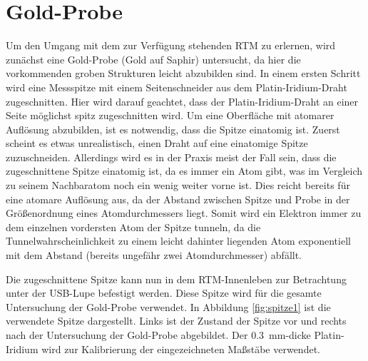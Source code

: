 \section{Gold-Probe}\label{sec:gold}
Um den Umgang mit dem zur Verfügung stehenden RTM zu erlernen, wird zunächst eine Gold-Probe (Gold auf Saphir) untersucht, da hier die vorkommenden groben Strukturen leicht
abzubilden sind. In einem ersten Schritt wird eine Messspitze mit einem Seitenschneider aus dem Platin-Iridium-Draht zugeschnitten. Hier wird darauf geachtet,
dass der Platin-Iridium-Draht an einer Seite möglichst spitz zugeschnitten wird. Um eine Oberfläche mit atomarer Auflösung abzubilden, ist es notwendig, dass
die Spitze einatomig ist. Zuerst scheint es etwas unrealistisch, einen Draht auf eine einatomige Spitze zuzuschneiden. Allerdings wird es in der Praxis
meist der Fall sein, dass die zugeschnittene Spitze einatomig ist, da es immer ein Atom gibt, was im Vergleich zu seinem Nachbaratom noch ein wenig weiter vorne ist.
Dies reicht bereits für eine atomare Auflösung aus, da der Abstand zwischen Spitze und Probe in der Größenordnung eines Atomdurchmessers liegt. Somit wird
ein Elektron immer zu dem einzelnen vordersten Atom der Spitze tunneln, da die Tunnelwahrscheinlichkeit zu einem leicht dahinter liegenden Atom exponentiell
mit dem Abstand (bereits ungefähr zwei Atomdurchmesser) abfällt.\par
Die zugeschnittene Spitze kann nun in dem RTM-Innenleben zur Betrachtung unter der USB-Lupe befestigt werden. Diese Spitze wird für die gesamte Untersuchung
der Gold-Probe verwendet. In Abbildung \cref{fig:spitze1} ist die verwendete Spitze dargestellt. Links ist der Zustand der Spitze vor und rechts nach der Untersuchung
der Gold-Probe abgebildet. Der \SI{0,3}{\milli \meter}-dicke Platin-Iridium wird zur Kalibrierung der eingezeichneten Maßstäbe verwendet.

